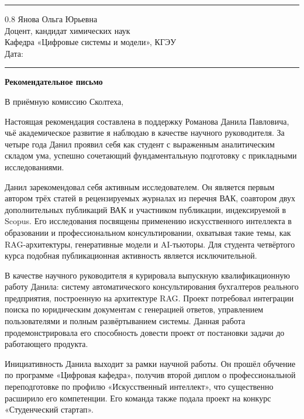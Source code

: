 \documentclass[a4paper,12pt]{article}
\begin{document}
\vspace{4pt}
\noindent\rule{\textwidth}{0.8pt}

\begin{flushright}
  \begin{spacing}{0.8}
    Янова Ольга Юрьевна\\
    Доцент, кандидат химических наук\\
    Кафедра «Цифровые системы и модели», КГЭУ\\[6pt]
    Дата: \rule{4cm}{0.4pt}
  \end{spacing}
\end{flushright}

\begin{center}
  {\Large\bfseries Рекомендательное письмо}
\end{center}

В приёмную комиссию Сколтеха,

Настоящая рекомендация составлена в поддержку Романова Данила Павловича, чьё академическое развитие я наблюдаю в качестве научного руководителя. За четыре года Данил проявил себя как студент с выраженным аналитическим складом ума, успешно сочетающий фундаментальную подготовку с прикладными исследованиями.

Данил зарекомендовал себя активным исследователем. Он является первым автором трёх статей в рецензируемых журналах из перечня ВАК, соавтором двух дополнительных публикаций ВАК и участником публикации, индексируемой в Scopus. Его исследования посвящены применению искусственного интеллекта в образовании и профессиональном консультировании, охватывая такие темы, как RAG-архитектуры, генеративные модели и AI-тьюторы. Для студента четвёртого курса подобная публикационная активность является исключительной.

В качестве научного руководителя я курировала выпускную квалификационную работу Данила: систему автоматического консультирования бухгалтеров реального предприятия, построенную на архитектуре RAG. Проект потребовал интеграции поиска по юридическим документам с генерацией ответов, управлением пользователями и полным развёртыванием системы. Данная работа продемонстрировала его способность довести проект от постановки задачи до работающего продукта.

Инициативность Данила выходит за рамки научной работы. Он прошёл обучение по программе «Цифровая кафедра», получив второй диплом о профессиональной переподготовке по профилю «Искусственный интеллект», что существенно расширило его компетенции. Его команда также подала проект на конкурс «Студенческий стартап».
\end{document}

